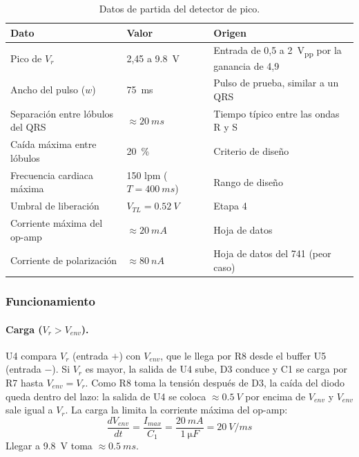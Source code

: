 \documentclass[11pt,letterpaper]{article}
\newcommand{\Vr}{V_r}
\newcommand{\Venv}{V_{env}}
\newcommand{\VTL}{V_{TL}}
\begin{document}
\begin{table}[H]
\centering
\caption{Datos de partida del detector de pico.}\label{tab:datos3}
\begin{tabularx}{\linewidth}{@{}llX@{}}
\toprule
Dato & Valor & Origen \\
\midrule
Pico de $\Vr$ & 2,45 a \SI{9,8}{V} & Entrada de 0,5 a \SI{2}{V_{pp}} por la ganancia de 4,9 \\
Ancho del pulso ($w$) & \SI{75}{ms} & Pulso de prueba, similar a un QRS \\
Separación entre lóbulos del QRS & $\approx\SI{20}{ms}$ & Tiempo típico entre las ondas R y S \\
Caída máxima entre lóbulos & \SI{20}{\percent} & Criterio de diseño \\
Frecuencia cardiaca máxima & 150 lpm ($T=\SI{400}{ms}$) & Rango de diseño \\
Umbral de liberación & $\VTL=\SI{0,52}{V}$ & Etapa 4 \\
Corriente máxima del op-amp & $\approx\SI{20}{mA}$ & Hoja de datos \\
Corriente de polarización & $\approx\SI{80}{nA}$ & Hoja de datos del 741 (peor caso) \\
\bottomrule
\end{tabularx}
\end{table}

\subsubsection{Funcionamiento}

\paragraph{Carga ($\Vr>\Venv$).} U4 compara $\Vr$ (entrada $+$) con $\Venv$, que le llega por R8 desde el buffer U5 (entrada $-$). Si $\Vr$ es mayor, la salida de U4 sube, D3 conduce y C1 se carga por R7 hasta $\Venv=\Vr$. Como R8 toma la tensión después de D3, la caída del diodo queda dentro del lazo: la salida de U4 se coloca $\approx\SI{0,5}{V}$ por encima de $\Venv$ y $\Venv$ sale igual a $\Vr$. La carga la limita la corriente máxima del op-amp:
\begin{equation}
\frac{d\Venv}{dt}=\frac{I_{max}}{C_1}=\frac{\SI{20}{mA}}{\SI{1}{\micro F}}=\SI{20}{V/ms}
\end{equation}
Llegar a \SI{9,8}{V} toma $\approx\SI{0,5}{ms}$.
\end{document}
